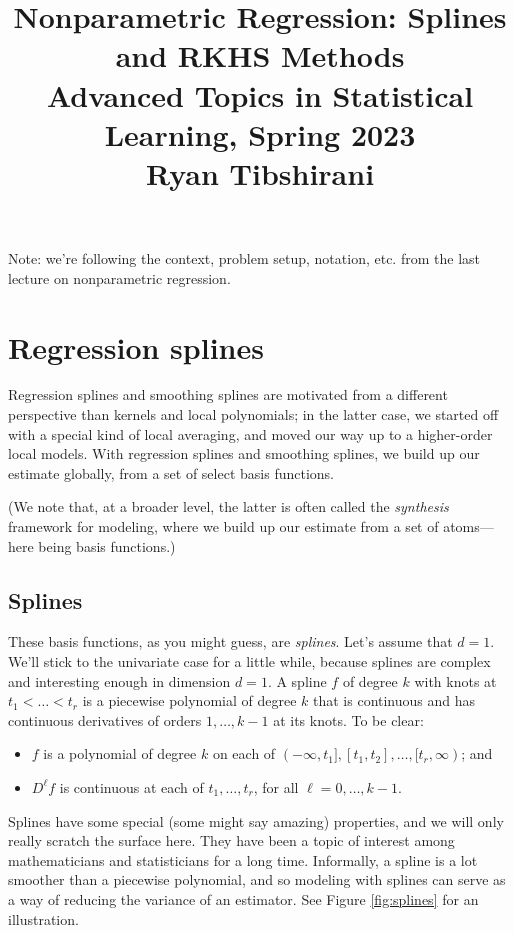 \documentclass{article}
\title{Nonparametric Regression: Splines and RKHS Methods \\ \smallskip
\large Advanced Topics in Statistical Learning, Spring 2023 \\ \smallskip
Ryan Tibshirani}
\author{}
\date{}
\begin{document}
\maketitle
\RaggedRight
\vspace{-50pt}

Note: we're following the context, problem setup, notation, etc. from the last
lecture on nonparametric regression.

\section{Regression splines}

Regression splines and smoothing splines are motivated from a different
perspective than kernels and local polynomials; in the latter case, we started
off with a special kind of local averaging, and moved our way up to a
higher-order local models. With regression splines and smoothing splines, we
build up our estimate globally, from a set of select basis functions. 

(We note that, at a broader level, the latter is often called the
\emph{synthesis} framework for modeling, where we build up our estimate from a
set of atoms---here being basis functions.) 

\subsection{Splines}

These basis functions, as you might guess, are \emph{splines}. Let's assume that
$d=1$. We'll stick to the univariate case for a little while, because splines
are complex and interesting enough in dimension $d=1$. A spline $f$ of degree
$k$ with knots at $t_1 < \dots < t_r$ is a piecewise polynomial of degree $k$  
that is continuous and has continuous derivatives of orders $1,\dots,k-1$ at its
knots. To be clear: 
\begin{itemize}
\item $f$ is a polynomial of degree $k$ on each of $(-\infty,t_1], [t_1,t_2],
  \dots, [t_r,\infty)$; and
\item $D^\ell f$ is continuous at each of $t_1,\dots,t_r$, for all
  $\ell=0,\dots,k-1$. 
\end{itemize}

Splines have some special (some might say amazing) properties, and we will only
really scratch the surface here. They have been a topic of interest among
mathematicians and statisticians for a long time. Informally, a spline is a lot
smoother than a piecewise polynomial, and so modeling with splines can serve as
a way of reducing the variance of an estimator. See Figure \ref{fig:splines} for
an illustration.  
\end{document}
